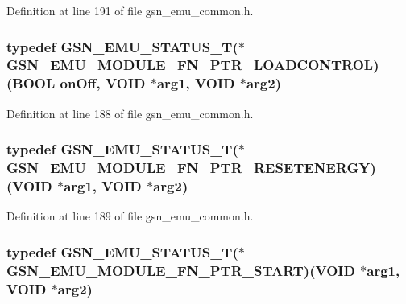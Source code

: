 Definition at line 191 of file gsn\_\-emu\_\-common.h.

\hypertarget{a00490_a34475255b9c6517a46adea1b1cbca0bb}{
\subsubsection[{GSN\_\-EMU\_\-MODULE\_\-FN\_\-PTR\_\-LOADCONTROL}]{\setlength{\rightskip}{0pt plus 5cm}typedef {\bf GSN\_\-EMU\_\-STATUS\_\-T}($\ast$  {\bf GSN\_\-EMU\_\-MODULE\_\-FN\_\-PTR\_\-LOADCONTROL})({\bf BOOL} onOff, VOID $\ast$arg1, VOID $\ast$arg2)}}
\label{a00490_a34475255b9c6517a46adea1b1cbca0bb}


Definition at line 188 of file gsn\_\-emu\_\-common.h.

\hypertarget{a00490_a343265e26c41f9b84c1c91d6d0006343}{
\subsubsection[{GSN\_\-EMU\_\-MODULE\_\-FN\_\-PTR\_\-RESETENERGY}]{\setlength{\rightskip}{0pt plus 5cm}typedef {\bf GSN\_\-EMU\_\-STATUS\_\-T}($\ast$  {\bf GSN\_\-EMU\_\-MODULE\_\-FN\_\-PTR\_\-RESETENERGY})(VOID $\ast$arg1, VOID $\ast$arg2)}}
\label{a00490_a343265e26c41f9b84c1c91d6d0006343}


Definition at line 189 of file gsn\_\-emu\_\-common.h.

\hypertarget{a00490_ab5cebba523e2b72d76d138a05442f45f}{
\subsubsection[{GSN\_\-EMU\_\-MODULE\_\-FN\_\-PTR\_\-START}]{\setlength{\rightskip}{0pt plus 5cm}typedef {\bf GSN\_\-EMU\_\-STATUS\_\-T}($\ast$  {\bf GSN\_\-EMU\_\-MODULE\_\-FN\_\-PTR\_\-START})(VOID $\ast$arg1, VOID $\ast$arg2)}}
\label{a00490_ab5cebba523e2b72d76d138a05442f45f}


